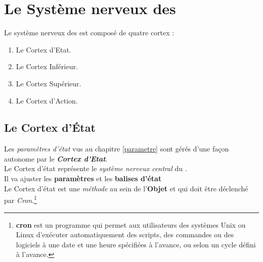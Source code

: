 \documentclass[french]{report}
\newlength{\du}\fi
\begin{document}
\newpage
\section{Le Système nerveux des \CoCiX}\label{nerveux}

Le système nerveux des \CoCiX est composé de quatre cortex :
\begin{enumerate}
	\item Le Cortex d'Etat.
	\item Le Cortex Inférieur.
	\item Le Cortex Supérieur.
	\item Le Cortex d'Action. \\
\end{enumerate}

\subsection{Le Cortex d'État}\label{cortex_etat}

Les \textit{paramètres d'état} vus au chapitre \ref{parametre} sont gérés d'une façon autonome par le \textit{\textbf{Cortex d'Etat}}.\\
Le Cortex d'état représente  le \textit{système nerveux central} du \CoCiX.\\
Il va ajuster les \textbf{paramètres} et les \textbf{balises d'état}\\
Le Cortex d'état est une \textit{méthode} au sein de l'\textbf{Objet} \CoCiX et qui doit être déclenché par \textit{Cron}.\footnote{\textbf{cron} est un programme qui permet aux utilisateurs des systèmes Unix  ou Linux d'exécuter automatiquement des scripts, des commandes ou des logiciels à une date et une heure spécifiées à l'avance, ou selon un cycle défini à l'avance.}\\
\end{document}
